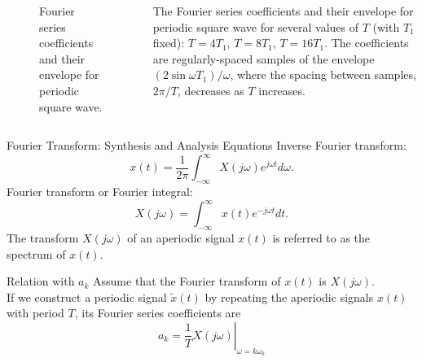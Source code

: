 \begin{frame}[plain,t]
    \begin{columns}
        {
        \begin{figure}
          \centering
          
          \caption{Fourier series coefficients and their envelope for periodic square wave.}\label{fi:periodic_square_fs_samples_of_envilope}
        \end{figure}
        }
        {
            \small
            \noindent The Fourier series coefficients and their envelope for periodic square wave for several values of $T$ (with $T_1$ fixed): $T=4T_1$, $T=8T_1$, $T=16T_1$. The coefficients are regularly-spaced samples of the envelope $(2\sin \omega T_1)/\omega$, where the spacing between samples, $2\pi/T$, decreases as $T$ increases.
        }
    \end{columns}
\end{frame}


\begin{frame}{Fourier Transform: Synthesis and Analysis Equations}
    Inverse Fourier transform:
    \begin{equation}\label{eq:ift}
        x(t) = \frac{1}{2\pi}\int_{-\infty}^{\infty}X(j\omega)e^{j\omega t} d\omega.
    \end{equation}
    Fourier transform or Fourier integral:
    \begin{equation}\label{eq:ft}
        X(j\omega) = \int_{-\infty}^{\infty}x(t)e^{-j\omega t} dt.
    \end{equation}
    The transform $X(j\omega)$ of an aperiodic signal $x(t)$ is referred to as the spectrum of $x(t)$.
\end{frame}

\begin{frame}{Relation with $a_k$}
    Assume that the Fourier transform of $x(t)$ is $X(j\omega)$.\\
    If we construct a periodic signal $\tilde{x}(t)$ by repeating the aperiodic signals $x(t)$ with period $T$, its Fourier series coefficients are
    \begin{equation}
        a_k = \left.\frac{1}{T}X(j\omega)\right|_{\omega=k\omega_0}
    \end{equation}
\end{frame}


